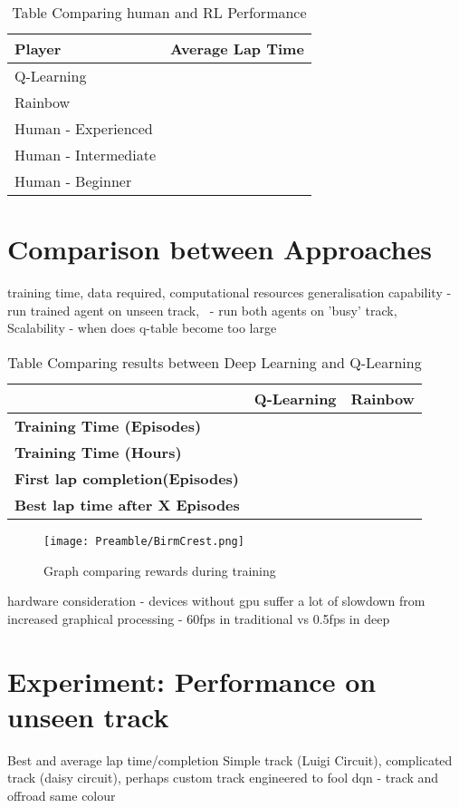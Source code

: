 \begin{table}[htb]
    \centering
    \begin{tabular}{l|l}
    \textbf{Player} & \textbf{Average Lap Time}\\
    \hline
    Q-Learning    &  \\
    Rainbow & \\
    Human - Experienced & \\
    Human - Intermediate & \\
    Human - Beginner &  
    \end{tabular}
    \caption{Table Comparing human and RL Performance}
    \label{tab:lap-times}
\end{table}
\section{Comparison between Approaches}
training time, data required, computational resources
generalisation capability - run trained agent on unseen track, \ - run both agents on 'busy' track, \\Scalability - when does q-table become too large
\begin{table}[h]
    \centering
    \begin{tabular}{l|c|l}
    & \textbf{Q-Learning} & \textbf{Rainbow}\\
    \hline
    \textbf{Training Time (Episodes)}  &   &  \\
    \textbf{Training Time (Hours)}   &  &  \\
    \textbf{First lap completion(Episodes)}   &  &  \\
    \textbf{Best lap time after X Episodes}   &  &  \\
    \end{tabular}
    \caption{Table Comparing results between Deep Learning and Q-Learning}
    \label{tab:rl-comparison}
\end{table}
\begin{figure}
    \centering
    \texttt{[image: Preamble/BirmCrest.png]}
    \caption{Graph comparing rewards during training}
    \label{fig:q-vs-deep-rewards}
\end{figure}

hardware consideration - devices without gpu suffer a lot of slowdown from increased graphical processing - 60fps in traditional vs 0.5fps in deep
\section{Experiment: Performance on unseen track}
Best and average lap time/completion
Simple track (Luigi Circuit), complicated track (daisy circuit), perhaps custom track engineered to fool dqn - track and offroad same colour